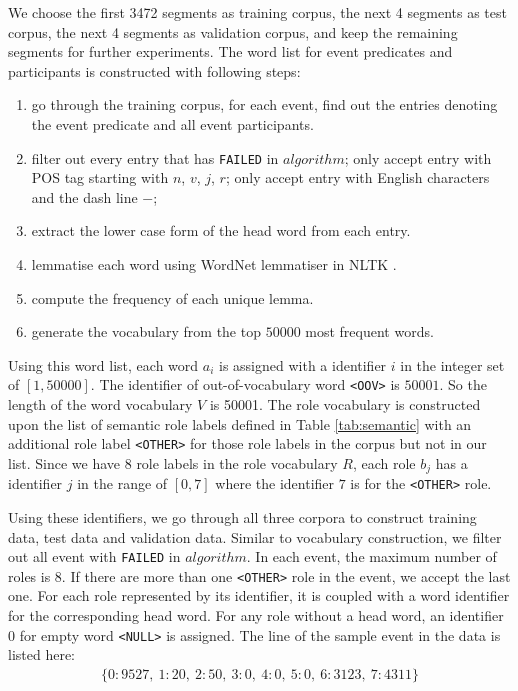 \documentclass[a4paper]{article}
\begin{document}
We choose the first 3472 segments as training corpus, the next 4 segments as test corpus, the next 4 segments as validation corpus, and keep the remaining segments for further experiments. The word list for event predicates and participants is constructed with following steps: 
\begin{enumerate}
  \item  go through the training corpus, for each event, find out the entries denoting the event predicate and all event participants. 
  \item  filter out every entry that has \texttt{FAILED} in $algorithm$; only accept entry with POS tag starting with $n$, $v$, $j$, $r$; only accept entry with English characters and the dash line $-$; 
  \item  extract the lower case form of the head word from each entry.
  \item  lemmatise each word using WordNet \citep{miller1995wordnet} lemmatiser in NLTK \citep{bird2006nltk}. 
  \item  compute the frequency of each unique lemma. 
  \item  generate the vocabulary from the top $50000$ most frequent words. 
\end{enumerate}
Using this word list, each word $a_i$ is assigned with a identifier $i$ in the integer set of $[1, 50000]$. The identifier of out-of-vocabulary word \texttt{<OOV>} is $50001$. So the length of the word vocabulary $V$ is 50001. The role vocabulary is constructed upon the list of semantic role labels defined in Table \ref{tab:semantic} with an additional role label \texttt{<OTHER>} for those role labels in the corpus but not in our list. Since we have $8$ role labels in the role vocabulary $R$, each role $b_j$ has a identifier $j$ in the range of $[0, 7]$ where the identifier $7$ is for the \texttt{<OTHER>} role. 

Using these identifiers, we go through all three corpora to construct training data, test data and validation data. Similar to vocabulary construction, we filter out all event with \texttt{FAILED} in $algorithm$. In each event, the maximum number of roles is $8$. If there are more than one \texttt{<OTHER>} role in the event, we accept the last one. For each role represented by its identifier, it is coupled with a word identifier for the corresponding head word. For any role without a head word, an identifier $0$ for empty word \texttt{<NULL>} is assigned. The line of the sample event in the data is listed here: 
\begin{equation} \label{eq:eg-data}
\begin{aligned}
  \{ 0:9527,\ 1:20,\ 2:50,\ 3:0,\ 4:0,\ 5:0,\ 6:3123,\ 7:4311\}
\end{aligned}
\end{equation}
\end{document}
